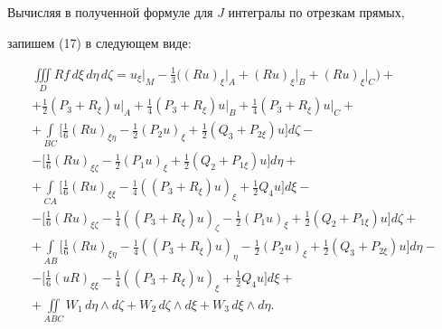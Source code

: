 Вычисляя в полученной формуле для $J$ интегралы по отрезкам прямых,


запишем (17) в следующем виде:


\begin{multline}


\iiint\limits_{D} Rf\,d\xi\, d\eta\, d\zeta=


u_{\xi}\big|_{M} -\frac{1}{3}\big(


(Ru)_{\xi}\big|_{A}+ (Ru)_{\xi}\big|_{B}+


(Ru)_{\xi}\big|_{C}\big)+ \\


%


+\frac{1}{2}(P_3 +R_\xi)u\big|_{A}


+\frac{1}{4}(P_3 +R_\xi)u\big|_{B}


+\frac{1}{4}(P_3 +R_\xi)u\big|_{C}+ \\


%


+\int\limits_{BC}


\bigg[ \frac{1}{6} (Ru)_{\xi\eta}-\frac{1}{2} (P_2 u)_\xi


+\frac{1}{2} (Q_3+P_{2\xi})u \bigg] d\zeta - \\


%


-\bigg[ \frac{1}{6} (Ru)_{\xi\zeta}-\frac{1}{2} (P_1 u)_\xi


+\frac{1}{2} (Q_2+P_{1\xi})u \bigg] d\eta + \\


%


+\int\limits_{CA}


\bigg[ \frac{1}{6} (Ru)_{\xi\xi}-\frac{1}{4}


((P_3 +R_\xi)u)_\xi +\frac{1}{2} Q_4 u\bigg] d\xi - \\


%


-\bigg[ \frac{1}{6} (Ru)_{\xi\zeta}-\frac{1}{4}


((P_3 +R_\xi)u)_\zeta -\frac{1}{2}


(P_1 u)_\xi +\frac{1}{2} (Q_2+P_{1\xi})u \bigg] d\zeta + \\


%


+\int\limits_{AB} \bigg[


\frac{1}{6} (Ru)_{\xi\eta}-\frac{1}{4}


((P_3 +R_\xi)u)_\eta -\frac{1}{2} (P_2 u)_\xi


+\frac{1}{2} (Q_3 +P_{2\xi})u \bigg] d\eta - \\


%


-\bigg[ \frac{1}{6} (uR)_{\xi\xi} -\frac{1}{4}


((P_3 +R_\xi)u)_\xi +\frac{1}{2} Q_4 u\bigg] d\xi+ \\


%


+\iint\limits_{ABC} W_1\, d\eta\wedge d\zeta


+W_2\, d\zeta \wedge d\xi + W_3\, d\xi \wedge d\eta.


\end{multline}



